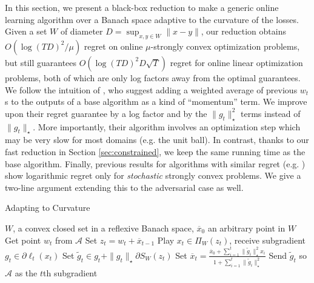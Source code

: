 \documentclass[12pt]{colt2018} %
\newcommand{\ol}{\mathcal{A}}
\begin{document}
In this section, we present a black-box reduction to make a generic online learning algorithm over a Banach space adaptive to the curvature of the losses. Given a set $W$ of diameter $D=\sup_{x,y\in W}\|x-y\|$, our reduction obtains $O(\log(TD)^2/\mu)$ regret on online $\mu$-strongly convex optimization problems, but still guarantees $O(\log(TD)^2D\sqrt{T})$ regret for online linear optimization problems, both of which are only log factors away from the optimal guarantees. We follow the intuition of \citep{cutkosky2017stochastic}, who suggest adding a weighted average of previous $w_t$s to the outputs of a base algorithm as a kind of ``momentum'' term. We improve upon their regret guarantee by a log factor and by the $\|g_t\|_\star^2$ terms instead of $\|g_t\|_\star$. More importantly, their algorithm involves an optimization step which may be very slow for most domains (e.g. the unit ball). In contrast, thanks to our fast reduction in Section \ref{sec:constrained}, we keep the same running time as the base algorithm.
Finally, previous results for algorithms with similar regret (e.g. \citep{cutkosky2017stochastic, vanervan2016metagrad}) show logarithmic regret only for \emph{stochastic} strongly convex problems. We give a two-line argument extending this to the adversarial case as well.

\begin{algorithm}[ht!]
\caption{Adapting to Curvature}
\label{alg:metagradreduction}
\begin{algorithmic}[1]
   \REQUIRE{Online learning algorithm $\ol$}
    $W$, a convex closed set in a reflexive Banach space, $\overline{x}_0$ an arbitrary point in $W$
   \STATE Get point $w_t$ from $\ol$
   \STATE Set $z_t = w_t+\overline{x}_{t-1}$
   \STATE Play $x_t \in \Pi_W(z_t)$, receive subgradient $g_t\in\partial \ell_t(x_t)$
   \STATE Set $\tilde g_t \in g_t+ \|g_t\|_\star  \partial S_W(z_t)$
   \STATE Set $\overline{x}_t = \tfrac{\overline{x}_0+\sum_{i=1}^t \|\tilde {g}_{i}\|_\star ^2 x_{i}}{1+\sum_{i=1}^t \|\tilde{g}_i\|_\star ^2}$
   \STATE Send $\tilde{g}_t$ so $\ol$ as the $t$th subgradient
   \ENDFOR
\end{algorithmic}
\end{algorithm}
\end{document}
